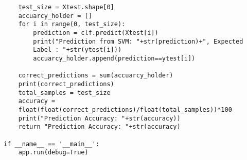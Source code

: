\begin{lstlisting}
    test_size = Xtest.shape[0]
    accuarcy_holder = []
    for i in range(0, test_size):
        prediction = clf.predict(Xtest[i])
        print("Prediction from SVM: "+str(prediction)+", Expected
        Label : "+str(ytest[i]))
        accuarcy_holder.append(prediction==ytest[i])

    correct_predictions = sum(accuarcy_holder)
    print(correct_predictions)
    total_samples = test_size
    accuracy =
    float(float(correct_predictions)/float(total_samples))*100
    print("Prediction Accuracy: "+str(accuracy))
    return "Prediction Accuracy: "+str(accuracy)

if __name__ == '__main__':
    app.run(debug=True)
\end{lstlisting}


\begin{comment}
\section{Draft: Deep Learning}

\section{Draft: Time Series}
\subsection{Overview of Time-Series Data}
This section will explore the make up of time-series (TS) data, and
the fundamental concepts needed to analyze TS date. More importantly
why simple linear regression models cannot be used. 
\subsection{Why is TS Data Important?}
This section will explore the application and relevance of TS data
with respect to big-data. 
\subsection{Forecasting TS data}
This section will explore TS forecasting methods such as the ARIMA
model, ARCH/GARCH model, Vector Autoregression model, LSTM model and
NARX Networks...time permitting ELMAN and JORDAN networks. 
 
\end{comment}

